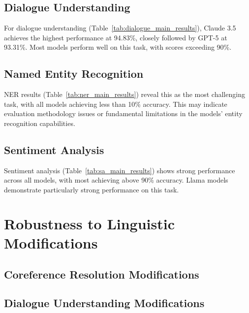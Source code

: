 \documentclass[11pt]{article}
\begin{document}
\subsection{Dialogue Understanding}



For dialogue understanding (Table~\ref{tab:dialogue_main_results}), Claude 3.5 achieves the highest 
performance at 94.83\%, closely followed by GPT-5 at 93.31\%. Most models perform well on this task, 
with scores exceeding 90\%.

\subsection{Named Entity Recognition}



NER results (Table~\ref{tab:ner_main_results}) reveal this as the most challenging task, with all 
models achieving less than 10\% accuracy. This may indicate evaluation methodology issues or 
fundamental limitations in the models' entity recognition capabilities.

\subsection{Sentiment Analysis}



Sentiment analysis (Table~\ref{tab:sa_main_results}) shows strong performance across all models, 
with most achieving above 90\% accuracy. Llama models demonstrate particularly strong performance 
on this task.

\section{Robustness to Linguistic Modifications}

\subsection{Coreference Resolution Modifications}



\subsection{Dialogue Understanding Modifications}


\end{document}
